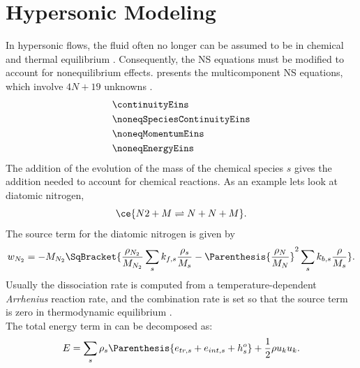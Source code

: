 \section{Hypersonic Modeling\label{ch3:hypersonicModeling}}
In hypersonic flows, the fluid often no longer can be assumed to be in chemical and
thermal equilibrium \cite{Candler2019}. Consequently, the \gls{NS} equations must be
modified to account for nonequilibrium effects. 
presents the multicomponent \gls{NS} equations, which involve $4N+19$ unknowns
\cite{Daily2018}.
\begin{subequations}\label{eq:navierStokesNoneq}
    \begin{align}
        &\continuityEins \label{eq:noneqSpeciesContinuity}\\
        &\noneqSpeciesContinuityEins \label{eq:noneqSpecies} \\
        &\noneqMomentumEins \label{eq:noneqMomentum} \\
        &\noneqEnergyEins \label{eq:noneqEnegy}
    \end{align}
\end{subequations}
The addition of the evolution of the mass of the chemical species $s$
 gives the addition needed to account for chemical
reactions. As an example lets look at diatomic nitrogen, 
\begin{equation}\label{eq:diatomicNitrogen}
    \ce{N2 + M \rightleftharpoons N + N + M}.
\end{equation}
The source term for the diatomic nitrogen is given by
\begin{equation}\label{eq:diatomicNitrogenSourceTerm}
    w_{N_2} = -M_{N_2} \SqBracket{\frac{\rho_{N_2}}{M_{N_2}}
    \sum_{s}k_{f,s}\frac{\rho_s}{M_s} - \Parenthesis{\frac{\rho_N}{M_N}}^2 \sum_{s}
    k_{b,s}\frac{\rho}{M_s}  }.
\end{equation}
Usually the dissociation rate is computed from a temperature-dependent
\textit{Arrhenius} reaction rate, and the combination rate is set so that the
source term is zero in thermodynamic equilibrium \cite{Candler2019}.  \\

The total energy term in  can be decomposed as:
\begin{equation}\label{eq:totalDecomposedNoneqEnergy}
    E = \sum_s \rho_s\Parenthesis{e_{tr,s} + e_{int,s} + h_s^{o} } +
    \frac{1}{2}\rho u_k u_k.
\end{equation}

